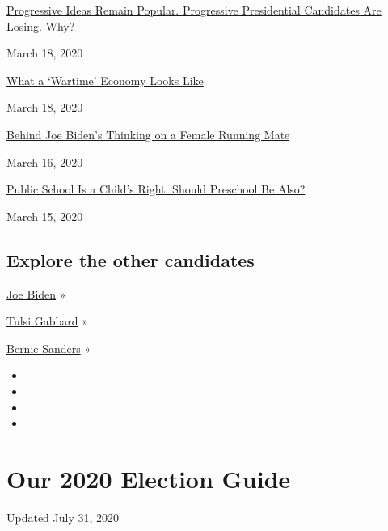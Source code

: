 \href{https://www.nytimes.com/2020/03/18/us/politics/bernie-sanders-progressives-elizabeth-warren.html}{Progressive
Ideas Remain Popular. Progressive Presidential Candidates Are Losing.
Why?}

March 18, 2020

\href{https://www.nytimes.com/2020/03/18/business/dealbook/coronavirus-war-spending.html}{What
a `Wartime' Economy Looks Like}

March 18, 2020

\href{https://www.nytimes.com/2020/03/16/us/politics/joe-biden-vp-running-mate.html}{Behind
Joe Biden's Thinking on a Female Running Mate}

March 16, 2020

\href{https://www.nytimes.com/2020/03/15/upshot/universal-child-care-democratic-platform.html}{Public
School Is a Child's Right. Should Preschool Be Also?}

March 15, 2020

\hypertarget{explore-the-other-candidates}{%
\subsection{Explore the other
candidates}\label{explore-the-other-candidates}}

\href{https://www.nytimes.com/interactive/2020/us/elections/joe-biden.html}{Joe
Biden} »

\href{https://www.nytimes.com/interactive/2020/us/elections/tulsi-gabbard.html}{Tulsi
Gabbard} »

\href{https://www.nytimes.com/interactive/2020/us/elections/bernie-sanders.html}{Bernie
Sanders} »

\begin{itemize}
\item
\item
\item
\item
\end{itemize}

\hypertarget{our-2020-election-guide}{%
\section{Our 2020 Election Guide}\label{our-2020-election-guide}}

Updated July 31, 2020

